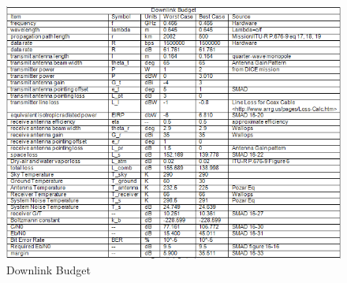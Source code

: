 \documentclass[12pt]{article}
\begin{document}
\begin{figure}[ht]
\centering 
\caption{Downlink Budget}
\includegraphics[width=6.5in]{images/comm-downlink-budget}
\end{figure}

\noindent
\newline
\newpage
\end{document}
